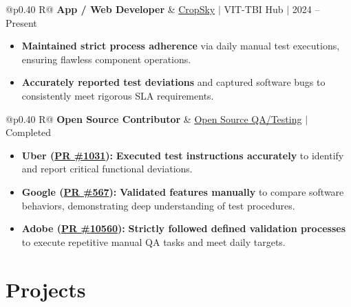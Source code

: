 \documentclass[a4paper,11pt]{article}
\newcommand{\subheading}[1]{\textbf{#1}}
\newcommand{\meta}[1]{{\fontsize{10}{12}\selectfont\textcolor[HTML]{3A3A3A}{#1}}}
\newcommand{\ulink}[2]{\href{#1}{#2}}
\begin{document}
\begin{tabularx}{\linewidth}{@{}p{0.40\linewidth} R@{}}
\subheading{App / Web Developer} & \meta{\ulink{https://sites.google.com/view/cropsky/home}{CropSky} $|$ VIT-TBI Hub $|$ 2024 -- Present}
\end{tabularx}
\begin{itemize}[nosep, leftmargin=1.5em, itemsep=2pt, topsep=2pt]
  \item {\color[HTML]{0A0A0A}\fontsize{11}{14}\selectfont \textbf{Maintained strict process adherence} via daily manual test executions, ensuring flawless component operations.}
  \item {\color[HTML]{0A0A0A}\fontsize{11}{14}\selectfont \textbf{Accurately reported test deviations} and captured software bugs to consistently meet rigorous SLA requirements.}
\end{itemize}

\begin{tabularx}{\linewidth}{@{}p{0.40\linewidth} R@{}}
\subheading{Open Source Contributor} & \meta{\ulink{https://github.com/su-jin1425/My-Open-Source-Contributions}{Open Source QA/Testing} $|$ Completed}
\end{tabularx}
\begin{itemize}[nosep, leftmargin=1.5em, itemsep=2pt, topsep=2pt]
  \item {\color[HTML]{0A0A0A}\fontsize{11}{14}\selectfont \textbf{Uber (\ulink{https://github.com/uber/causalml/pull/1031}{PR \#1031}):} \textbf{Executed test instructions accurately} to identify and report critical functional deviations.}
  \item {\color[HTML]{0A0A0A}\fontsize{11}{14}\selectfont \textbf{Google (\ulink{https://github.com/google/xrblocks/pull/567}{PR \#567}):} \textbf{Validated features manually} to compare software behaviors, demonstrating deep understanding of test procedures.}
  \item {\color[HTML]{0A0A0A}\fontsize{11}{14}\selectfont \textbf{Adobe (\ulink{https://github.com/adobe/react-spectrum/pull/10560}{PR \#10560}):} \textbf{Strictly followed defined validation processes} to execute repetitive manual QA tasks and meet daily targets.}
\end{itemize}

\section{Projects}
\vspace{2pt}
\end{document}
